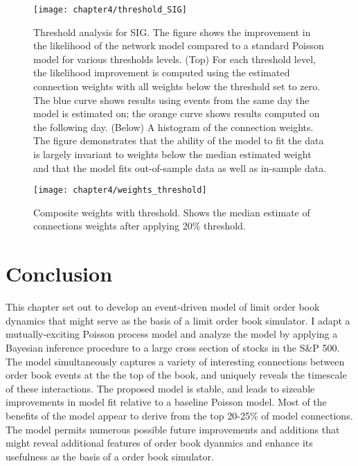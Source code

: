 			\begin{figure}[p]
				\small
				\linespread{1}
				\centering
				\captionsetup{labelsep=colon, font=footnotesize, justification=centerfirst, width=\linewidth}
				\texttt{[image: chapter4/threshold\_SIG]}
				\captionsetup{skip=-20pt, position=below, font=footnotesize, justification=justified, width=\linewidth}
				\caption[Threshold analysis for SIG]{Threshold analysis for SIG. The figure shows the improvement in the likelihood of the network model compared to a standard Poisson model for various thresholds levels. (Top) For each threshold level, the likelihood improvement is computed using the estimated connection weights with all weights below the threshold set to zero. The blue curve shows results using events from the same day the model is estimated on; the orange curve shows results computed on the following day. (Below) A histogram of the connection weights. The figure demonstrates that the ability of the model to fit the data is largely invariant to weights below the median estimated weight and that the model fits out-of-sample data as well as in-sample data.}
				\label{fig:threshold_SIG}
			\end{figure}

			\begin{figure}[p]
				\small
				\linespread{1}
				\centering
				\texttt{[image: chapter4/weights\_threshold]}
				\captionsetup{skip=-20pt, position=below, font=footnotesize, justification=justified, width=\linewidth}
				\caption[Composite weights with threshold]{Composite weights with threshold. Shows the median estimate of connections weights after applying 20\% threshold.}
				\label{fig:weights_threshold}
			\end{figure}


\section{Conclusion}
	This chapter set out to develop an event-driven model of limit order book dynamics that might serve as the basis of a limit order book simulator. I adapt a mutually-exciting Poisson process model and analyze the model by applying a Bayesian inference procedure to a large cross section of stocks in the S\&P 500. The model simultaneously captures a variety of interesting connections between order book events at the the top of the book, and uniquely reveals the timescale of these interactions. The proposed model is stable, and leads to sizeable improvements in model fit relative to a baseline Poisson model. Most of the benefits of the model appear to derive from the top 20-25\% of model connections. The model permits numerous possible future improvements and additions that might reveal additional features of order book dyanmics and enhance its usefulness as the basis of a order book simulator.
